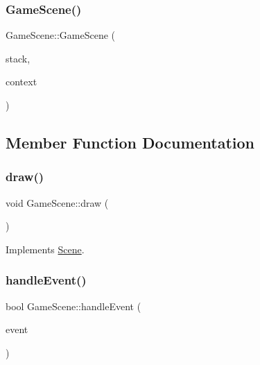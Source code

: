 \subsubsection{\texorpdfstring{Game\+Scene()}{GameScene()}}
{\footnotesize\ttfamily Game\+Scene\+::\+Game\+Scene (\begin{DoxyParamCaption}\item[{\hyperlink{class_scene_stack}{Scene\+Stack} \&}]{stack,  }\item[{\hyperlink{struct_scene_1_1_context}{Context}}]{context }\end{DoxyParamCaption})}



\subsection{Member Function Documentation}
\hypertarget{class_game_scene_ae9eb60cbb8fa55eeb07b951e3d83f426}{}\label{class_game_scene_ae9eb60cbb8fa55eeb07b951e3d83f426} 
\subsubsection{\texorpdfstring{draw()}{draw()}}
{\footnotesize\ttfamily void Game\+Scene\+::draw (\begin{DoxyParamCaption}{ }\end{DoxyParamCaption})\hspace{0.3cm}{\ttfamily [virtual]}}



Implements \hyperlink{class_scene_a789c16961aa1e316b2a4a05b95187546}{Scene}.

\hypertarget{class_game_scene_aa494372b1f451f3c3a268558fddb30f2}{}\label{class_game_scene_aa494372b1f451f3c3a268558fddb30f2} 
\subsubsection{\texorpdfstring{handle\+Event()}{handleEvent()}}
{\footnotesize\ttfamily bool Game\+Scene\+::handle\+Event (\begin{DoxyParamCaption}\item[{const sf\+::\+Event \&}]{event }\end{DoxyParamCaption})\hspace{0.3cm}{\ttfamily [virtual]}}



